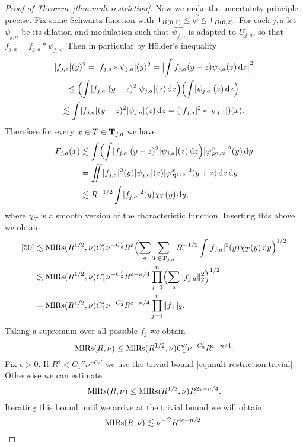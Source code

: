 \begin{proof}[Proof of Theorem~\ref{thm:mult-restriction}]
Now we make the uncertainty principle precise.
Fix some Schwartz function with $\one_{B(0,1)} \leq \widehat{\psi} \leq \one_{B(0,2)}$.
For each $j,a$ let $\psi_{j,a}$ be its dilation and modulation such that $\widehat{\psi_{j,a}}$ is adapted to $U_{j,a}$, so that $f_{j,a} = f_{j,a} * \psi_{j,a}$.
Then in particular by H\"older's inequality
\begin{multline*}
\abs{f_{j,a}}(y)^{2}
=
\abs{f_{j,a} * \psi_{j,a}}(y)^{2}
=
\abs[\big]{\int f_{j,a}(y-z) \psi_{j,a}(z) \dif z}^{2}\\
\leq
\Bigl( \int \abs{f_{j,a}}(y-z)^{2} \abs{\psi_{j,a}}(z) \dif z \Bigr)
\Bigl( \int \abs{\psi_{j,a}}(z) \dif z \Bigr)\\
\lesssim
\int \abs{f_{j,a}}(y-z)^{2} \abs{\psi_{j,a}}(z) \dif z
=
(\abs{f_{j,a}}^{2} * \abs{\psi_{j,a}})(x).
\end{multline*}
Therefore for every $x\in T \in \Tubes_{j,a}$ we have
\begin{align*}
F_{j,a}(x)
&\lesssim
\int \Bigl( \int \abs{f_{j,a}}(y-z)^{2} \abs{\psi_{j,a}}(z) \dif z \Bigr) \abs{\phi_{R^{1/2}}^{x}}^{2}(y) \dif y\\
&=
\iint \abs{f_{j,a}}^{2}(y) \abs{\psi_{j,a}}(z) \abs{\phi_{R^{1/2}}^{x}}^{2}(y+z) \dif z \dif y\\
&\lesssim
R^{-1/2} \int \abs{f_{j,a}}^{2}(y) \chi_{T}(y) \dif y,
\end{align*}
where $\chi_{T}$ is a smooth version of the characteristic function.
Inserting this above we obtain
\begin{align*}
\eqref{50}
&\lesssim
\MlRs(R^{1/2},\nu) C_{1}' \nu^{-C_{2}'} R^{\epsilon}
\Bigl( \sum_{a} \sum_{T \in \Tubes_{j,a}} R^{-1/2} \int \abs{f_{j,a}}^{2}(y) \chi_{T}(y) \dif y \Bigr)^{1/2}\\
&\lesssim
\MlRs(R^{1/2},\nu) C_{1}' \nu^{-C_{2}'} R^{\epsilon-n/4}
\prod_{j=1}^{n} \Bigl( \sum_{a} \norm{ f_{j,a} }_{2}^{2} \Bigr)^{1/2}\\
&=
\MlRs(R^{1/2},\nu) C_{1}' \nu^{-C_{2}'} R^{\epsilon-n/4}
\prod_{j=1}^{n} \norm{ f_{j} }_{2}.
\end{align*}
Taking a supremum over all possible $f_{j}$ we obtain
\[
\MlRs(R,\nu)
\leq
\MlRs(R^{1/2},\nu) C_{1}'' \nu^{-C_{2}'} R^{\epsilon-n/4}.
\]
Fix $\epsilon>0$.
If $R^{\epsilon} < C_{1}'' \nu^{-C_{2}'}$ we use the trivial bound \eqref{eq:mult-restriction:trivial}.
Otherwise we can estimate
\[
\MlRs(R,\nu)
\leq
\MlRs(R^{1/2},\nu) R^{2\epsilon-n/4}.
\]
Iterating this bound until we arrive at the trivial bound we will obtain
\[
\MlRs(R,\nu)
\lesssim
\nu^{-C} R^{4\epsilon-n/2}.
\qedhere
\]
\end{proof}

